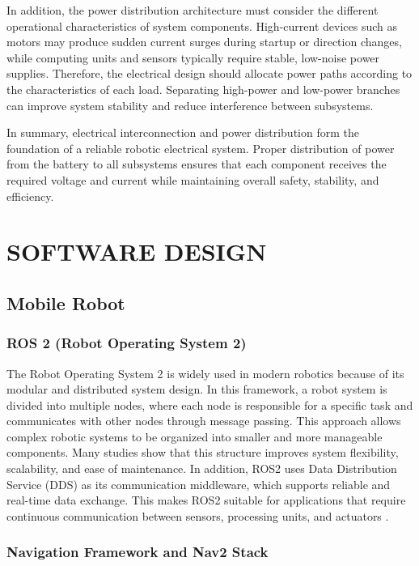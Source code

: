 In addition, the power distribution architecture must consider the different operational characteristics of system components. High-current devices such as motors may produce sudden current surges during startup or direction changes, while computing units and sensors typically require stable, low-noise power supplies. Therefore, the electrical design should allocate power paths according to the characteristics of each load. Separating high-power and low-power branches can improve system stability and reduce interference between subsystems.

In summary, electrical interconnection and power distribution form the foundation of a reliable robotic electrical system. Proper distribution of power from the battery to all subsystems ensures that each component receives the required voltage and current while maintaining overall safety, stability, and efficiency.


\section{SOFTWARE DESIGN}

\subsection{Mobile Robot}

\subsubsection{ROS 2 (Robot Operating System 2)}

The Robot Operating System 2 is widely used in modern robotics because of its modular and distributed system design. In this framework, a robot system is divided into multiple nodes, where each node is responsible for a specific task and communicates with other nodes through message passing. This approach allows complex robotic systems to be organized into smaller and more manageable components. Many studies show that this structure improves system flexibility, scalability, and ease of maintenance. In addition, ROS2 uses Data Distribution Service (DDS) as its communication middleware, which supports reliable and real-time data exchange. This makes ROS2 suitable for applications that require continuous communication between sensors, processing units, and actuators \cite{ros2}.

\subsubsection{Navigation Framework and Nav2 Stack}

